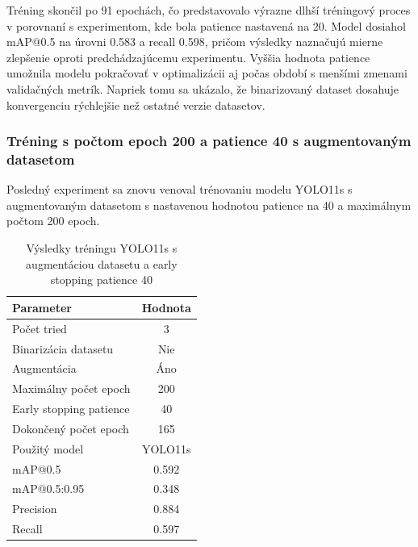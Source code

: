                 Tréning skončil po 91 epochách, čo predstavovalo výrazne dlhší tréningový proces v porovnaní s experimentom, kde bola patience nastavená na 20. Model dosiahol mAP@0.5 na úrovni 0.583 a recall 0.598, pričom výsledky naznačujú mierne zlepšenie oproti predchádzajúcemu experimentu. Vyššia hodnota patience umožnila modelu pokračovať v optimalizácii aj počas období s menšími zmenami validačných metrík. Napriek tomu sa ukázalo, že binarizovaný dataset dosahuje konvergenciu rýchlejšie než ostatné verzie datasetov.

                \subsubsection{Tréning s počtom epoch 200 a patience 40 s augmentovaným datasetom}

                Posledný experiment sa znovu venoval trénovaniu modelu YOLO11s s augmentovaným datasetom s nastavenou hodnotou patience na 40 a maximálnym počtom 200 epoch. 

                \begin{table}[H]
                    \centering
                    \begin{tabular}{|l|c|}
                    \hline
                    \textbf{Parameter} & \textbf{Hodnota} \\ \hline
                    Počet tried & 3 \\ \hline
                    Binarizácia datasetu & Nie \\ \hline
                    Augmentácia & Áno \\ \hline
                    Maximálny počet epoch & 200 \\ \hline
                    Early stopping patience & 40 \\ \hline
                    Dokončený počet epoch & 165 \\ \hline
                    Použitý model & YOLO11s \\ \hline
                    mAP@0.5 & 0.592 \\ \hline
                    mAP@0.5:0.95 & 0.348 \\ \hline
                    Precision & 0.884 \\ \hline
                    Recall & 0.597 \\ \hline
                    \end{tabular}
                    \caption{Výsledky tréningu YOLO11s s augmentáciou datasetu a early stopping patience 40}
                    \label{tab:yolo11s_augmented_earlystop_p40}
                \end{table}


